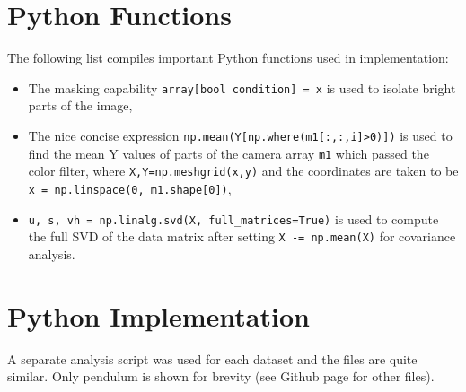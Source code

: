 \documentclass{article}
\begin{document}



\begin{appendices}

\newpage
\section{Python Functions}\label{functions}
The following list compiles important Python functions used in implementation:
\begin{itemize}
\item The masking capability \texttt{array[bool condition] = x} is used to isolate bright parts of the image,
\item The nice concise expression \texttt{np.mean(Y[np.where(m1[:,:,i]>0)])} is used to find the mean Y values of parts of the camera array \texttt{m1} which passed the color filter, where \texttt{X,Y=np.meshgrid(x,y)} and the coordinates are taken to be \texttt{x = np.linspace(0, m1.shape[0])},
\item \texttt{u, s, vh = np.linalg.svd(X, full\_matrices=True)} is used to compute the full SVD of the data matrix after setting \texttt{X -= np.mean(X)} for covariance analysis.
\end{itemize}

\section{Python Implementation}\label{implementation}
A separate analysis script was used for each dataset and the files are quite similar. Only pendulum is shown for brevity (see Github page for other files).

% 

\end{appendices}
\end{document}
